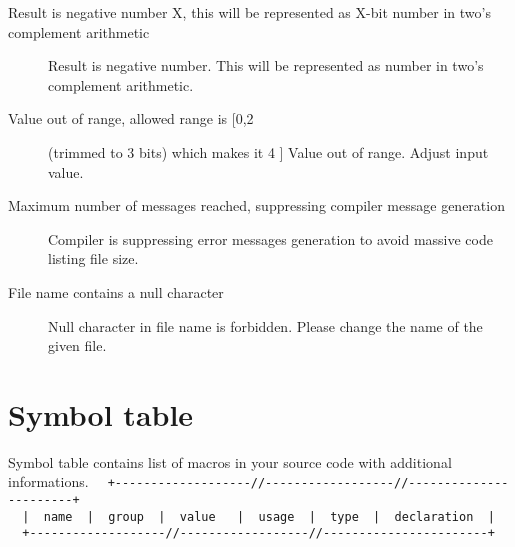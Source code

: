 \begin{description}
            \item[Result is negative number X, this will be represented as X-bit number in two's complement arithmetic]
                Result is negative number. This will be represented as number in two's complement arithmetic.
            \item[Value out of range, allowed range is [0,2] (trimmed to 3 bits) which makes it 4 ]
                Value out of range. Adjust input value.
            \item[Maximum number of messages reached, suppressing compiler message generation ]
                Compiler is suppressing error messages generation to avoid massive code listing file size.
            \item[File name contains a null character ]
                Null character in file name is forbidden. Please change the name of the given file.
        \end{description}

\section{Symbol table}
    Symbol table contains list of macros in your source code with additional informations.
    {
        \usecodefont
        \verb'  +-------------------//------------------//-----------------------+'\\
        \verb'  |  name  |  group  |  value   |  usage  |  type  |  declaration  |'\\
        \verb'  +-------------------//------------------//-----------------------+'\\
    }

